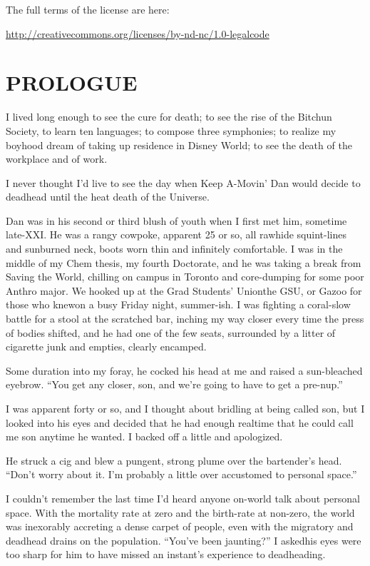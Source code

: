 The full terms of the license are here:

\href{http://creativecommons.org/licenses/by-nd-nc/1.0-legalcode}{http://creativecommons.org/licenses/by-nd-nc/1.0-legalcode}

\section{PROLOGUE}

I lived long enough to see the cure for death; to see the rise of
the Bitchun Society, to learn ten languages; to compose three
symphonies; to realize my boyhood dream of taking up residence in
Disney World; to see the death of the workplace and of work.

I never thought I'd live to see the day when Keep A-Movin' Dan
would decide to deadhead until the heat death of the Universe.

Dan was in his second or third blush of youth when I first met him,
sometime late-XXI. He was a rangy cowpoke, apparent 25 or so, all
rawhide squint-lines and sunburned neck, boots worn thin and
infinitely comfortable. I was in the middle of my Chem thesis, my
fourth Doctorate, and he was taking a break from Saving the World,
chilling on campus in Toronto and core-dumping for some poor Anthro
major. We hooked up at the Grad Students' Union{\dash}the GSU, or Gazoo
for those who knew{\dash}on a busy Friday night, summer-ish. I was
fighting a coral-slow battle for a stool at the scratched bar,
inching my way closer every time the press of bodies shifted, and
he had one of the few seats, surrounded by a litter of cigarette
junk and empties, clearly encamped.

Some duration into my foray, he cocked his head at me and raised a
sun-bleached eyebrow. “You get any closer, son, and we're going to
have to get a pre-nup.”

I was apparent forty or so, and I thought about bridling at being
called son, but I looked into his eyes and decided that he had
enough realtime that he could call me son anytime he wanted. I
backed off a little and apologized.

He struck a cig and blew a pungent, strong plume over the
bartender's head. “Don't worry about it. I'm probably a little over
accustomed to personal space.”

I couldn't remember the last time I'd heard anyone on-world talk
about personal space. With the mortality rate at zero and the
birth-rate at non-zero, the world was inexorably accreting a dense
carpet of people, even with the migratory and deadhead drains on
the population. “You've been jaunting?” I asked{\dash}his eyes were too
sharp for him to have missed an instant's experience to
deadheading.

